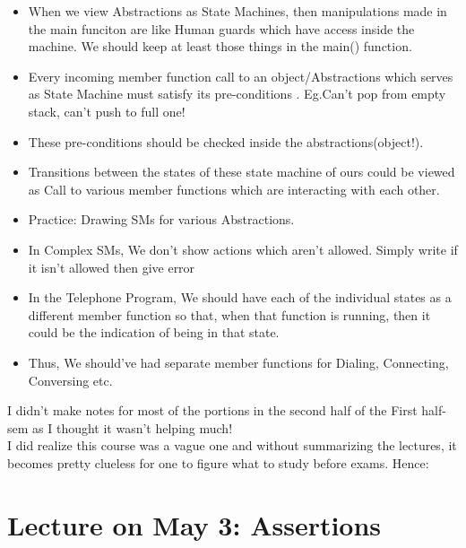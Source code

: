 \documentclass{article}
\begin{document}
\begin{itemize}
  \item When we view Abstractions as State Machines, then manipulations made in the main funciton are like Human guards which have access inside the machine. We should keep at least those things in the main() function.
  \item  Every incoming member function call to an object/Abstractions which serves as State Machine must satisfy its pre-conditions . Eg.Can't pop from empty stack, can't push to full one!
  \item These pre-conditions should be checked inside the abstractions(object!).
  \item Transitions between the states of these state machine of ours could be viewed as Call to various member functions which are interacting with each other.
  \item Practice: Drawing SMs for various Abstractions.
  \item In Complex SMs, We don't show actions which aren't allowed. Simply write if it isn't allowed then give error
  \item In the Telephone Program, We should have each of the individual states as a different member function so that, when that function is running, then it could be the indication of being in that state.
  \item Thus, We should've had separate member functions for Dialing, Connecting, Conversing etc.
\end{itemize}

I didn't make notes for most of the portions in the second half of the First half-sem as I thought it wasn't helping much! \\
I did realize this course was a vague one and without summarizing the lectures, it becomes pretty clueless for one to figure what to study before exams. Hence:

\section {Lecture on May 3: Assertions}
\end{document}
